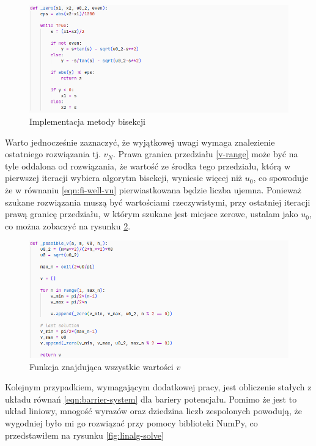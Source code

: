 \documentclass{SGGW-thesis}
\begin{document}
	\begin{figure}[h]
		\includegraphics[width=\textwidth,height=\textheight,keepaspectratio]{bisection.png}
		\caption{Implementacja metody bisekcji}
		\label{fig:bisection}
	\end{figure}

Warto jednocześnie zaznaczyć, że wyjątkowej uwagi wymaga znalezienie ostatniego rozwiązania tj. $v_N$. Prawa granica przedziału \ref{v-range} może być na tyle oddalona od rozwiązania, że wartość ze środka tego przedziału, którą w pierwszej iteracji wybiera algorytm bisekcji, wyniesie więcej niż $u_0$, co spowoduje że w równaniu \ref{eqn:fi-well-vu} pierwiastkowana będzie liczba ujemna. Ponieważ szukane rozwiązania muszą być wartościami rzeczywistymi, przy ostatniej iteracji prawą granicę przedziału, w którym szukane jest miejsce zerowe, ustalam jako $u_0$, co można zobaczyć na rysunku \ref{fig:bisection2}.
	\begin{figure}[H]
		\includegraphics[width=\textwidth,height=\textheight,keepaspectratio]{bisection2.png} 
		\caption{Funkcja znajdująca wszystkie wartości $v$}
		\label{fig:bisection2}
	\end{figure}
	
	Kolejnym przypadkiem, wymagającym dodatkowej pracy, jest obliczenie stałych z układu równań \ref{eqn:barrier-system} dla bariery potencjału. Pomimo że jest to układ liniowy, mnogość wyrazów oraz dziedzina liczb zespolonych powodują, że wygodniej było mi go rozwiązać przy pomocy biblioteki NumPy, co przedstawiłem na rysunku \ref{fig:linalg-solve}
	
\end{document}
